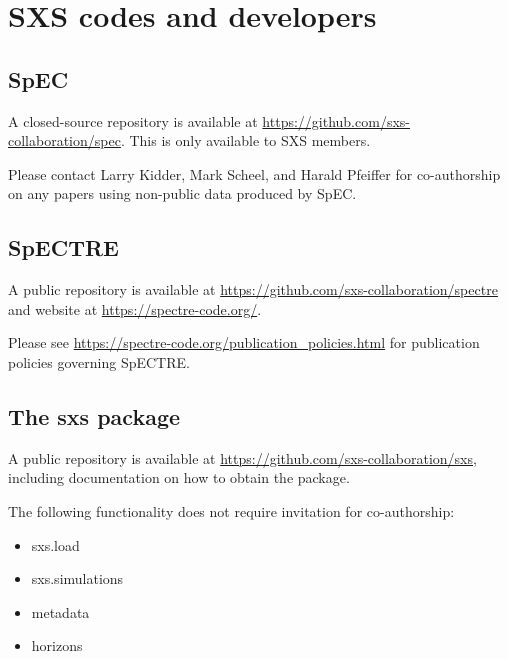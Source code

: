 \documentclass[12pt]{article}
\begin{document}
\section{SXS codes and developers}\label{sec:current_codes}
\subsection{SpEC}
A closed-source repository is available at
\url{https://github.com/sxs-collaboration/spec}. This is only available to SXS
members.

Please contact Larry Kidder, Mark Scheel, and Harald Pfeiffer for co-authorship
on any papers using non-public data produced by SpEC.

\subsection{SpECTRE}
A public repository is available at
\url{https://github.com/sxs-collaboration/spectre} and website at
\url{https://spectre-code.org/}.

Please see \url{https://spectre-code.org/publication_policies.html} for
publication policies governing SpECTRE.

\subsection{The sxs package}
A public repository is available at
\url{https://github.com/sxs-collaboration/sxs}, including documentation on how
to obtain the package.

The following functionality does not require invitation for co-authorship:
\vspace{-0.5em}
\begin{itemize}
  \setlength\itemsep{-0.5em}
\item sxs.load
\item sxs.simulations
\item metadata
\item horizons
\end{itemize}
\end{document}
